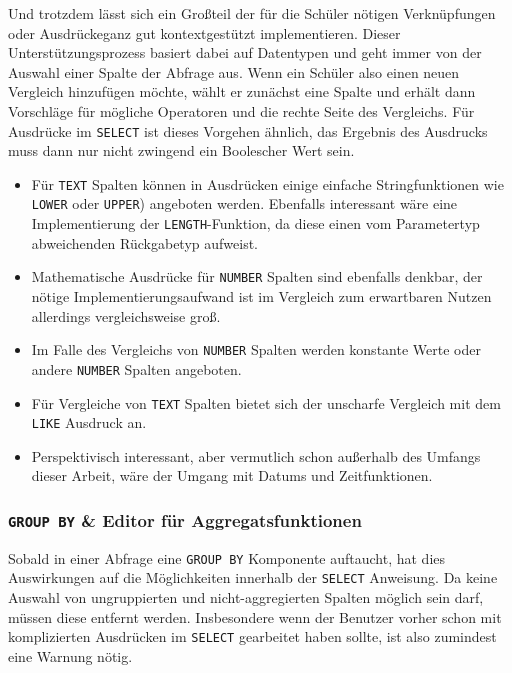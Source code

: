 \documentclass[paper=a4,fontsize=11pt,parskip=half]{scrartcl}
\begin{document}
Und trotzdem lässt sich ein Großteil der für die Schüler nötigen Verknüpfungen oder Ausdrückeganz gut kontextgestützt implementieren. Dieser Unterstützungsprozess basiert dabei auf Datentypen und geht immer von der Auswahl einer Spalte der Abfrage aus. Wenn ein Schüler also einen neuen Vergleich hinzufügen möchte, wählt er zunächst eine Spalte und erhält dann Vorschläge für mögliche Operatoren und die rechte Seite des Vergleichs. Für Ausdrücke im \texttt{SELECT} ist dieses Vorgehen ähnlich, das Ergebnis des Ausdrucks muss dann nur nicht zwingend ein Boolescher Wert sein.

\begin{itemize}
\item Für \texttt{TEXT} Spalten können in Ausdrücken einige einfache Stringfunktionen wie \texttt{LOWER} oder \texttt{UPPER}) angeboten werden. Ebenfalls interessant wäre eine Implementierung der \texttt{LENGTH}-Funktion, da diese einen vom Parametertyp abweichenden Rückgabetyp aufweist.
\item Mathematische Ausdrücke für \texttt{NUMBER} Spalten sind ebenfalls denkbar, der nötige Implementierungsaufwand ist im Vergleich zum erwartbaren Nutzen allerdings vergleichsweise groß.
\item Im Falle des Vergleichs von \texttt{NUMBER} Spalten werden konstante Werte oder andere \texttt{NUMBER} Spalten angeboten.
\item Für Vergleiche von \texttt{TEXT} Spalten bietet sich der unscharfe Vergleich mit dem \texttt{LIKE} Ausdruck an.
\item Perspektivisch interessant, aber vermutlich schon außerhalb des Umfangs dieser Arbeit, wäre der Umgang mit Datums und Zeitfunktionen.
\end{itemize}


\subsubsection{\texttt{GROUP BY} \& Editor für Aggregatsfunktionen}

Sobald in einer Abfrage eine \texttt{GROUP BY} Komponente auftaucht, hat dies Auswirkungen auf die Möglichkeiten innerhalb der \texttt{SELECT} Anweisung. Da keine Auswahl von ungruppierten und nicht-aggregierten Spalten möglich sein darf, müssen diese entfernt werden. Insbesondere wenn der Benutzer vorher schon mit komplizierten Ausdrücken im \texttt{SELECT} gearbeitet haben sollte, ist also zumindest eine Warnung nötig.
\end{document}
